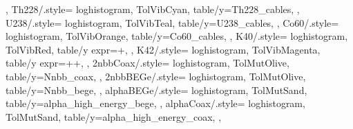 {{  },
  Th228/.style={%
    loghistogram,
    TolVibCyan,
    table/y=Th228_cables,
  },
  U238/.style={%
    loghistogram,
    TolVibTeal,
    table/y=U238_cables,
  },
  Co60/.style={%
    loghistogram,
    TolVibOrange,
    table/y=Co60_cables,
  },
  K40/.style={%
    loghistogram,
    TolVibRed,
    table/y expr=+,
  },
  K42/.style={%
    loghistogram,
    TolVibMagenta,
    table/y expr=++,
  },
  2nbbCoax/.style={%
    loghistogram,
    TolMutOlive,
    table/y=Nnbb_coax,
  },
  2nbbBEGe/.style={%
    loghistogram,
    TolMutOlive,
    table/y=Nnbb_bege,
  },
  alphaBEGe/.style={%
    loghistogram,
    TolMutSand,
    table/y=alpha_high_energy_bege,
  },
  alphaCoax/.style={%
    loghistogram,
    TolMutSand,
    table/y=alpha_high_energy_coax,
  },
}

\newcommand{\addbrasilianplot}{%
  \addplot[3sigu] table {\loadedtable};
  \addplot[3sigl] table {\loadedtable};
  \addplot[3sigb] fill between [of=3sigu and 3sigl];
  \addplot[2sigu] table {\loadedtable};
  \addplot[2sigl] table {\loadedtable};
  \addplot[2sigb] fill between [of=2sigu and 2sigl];
  \addplot[1sigu] table {\loadedtable};
  \addplot[1sigl] table {\loadedtable};
  \addplot[1sigb] fill between [of=1sigu and 1sigl];
  \addplot[ratio] table {\loadedtable};
}

